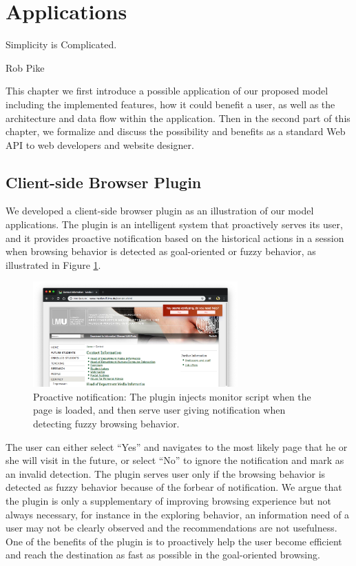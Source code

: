 \section{Applications}
\label{ch:app}

\epigraph{Simplicity is Complicated.}{Rob Pike}

This chapter we first introduce a possible application of our proposed model
including the implemented features, how it could benefit a user, as well as the 
architecture and data flow within the application.
Then in the second part of this chapter, we formalize and discuss 
the possibility and benefits as a standard Web API to web developers and website designer.

\subsection{Client-side Browser Plugin}
\label{sec:plugin}

We developed a client-side browser plugin as an illustration of our model applications.
The plugin is an intelligent system that proactively serves its user, 
and it provides proactive notification based on the historical actions in a session
when browsing behavior is detected as goal-oriented or fuzzy behavior, 
as illustrated in Figure \ref{fig:proactive-noti}.

\begin{figure}[H]
    \centering
    \includegraphics[width=0.7\textwidth]{figures/proactive-noti}
    \caption{Proactive notification:
    The plugin injects monitor script when the page is loaded, and then serve user giving
    notification when detecting fuzzy browsing behavior.}
    \label{fig:proactive-noti}
\end{figure}

The user can either select ``Yes'' and navigates to the most likely page that he or she 
will visit in the future, or select ``No'' to ignore the notification and mark as an invalid detection.
The plugin serves user only if the browsing behavior is detected as fuzzy behavior because
of the forbear of notification. We argue that the plugin is only a supplementary of improving
browsing experience but not always necessary, for instance in the exploring behavior, an information
need of a user may not be clearly observed and the recommendations are not usefulness. 
One of the benefits of the plugin is to proactively help the user become efficient
and reach the destination as fast as possible in the goal-oriented browsing.

